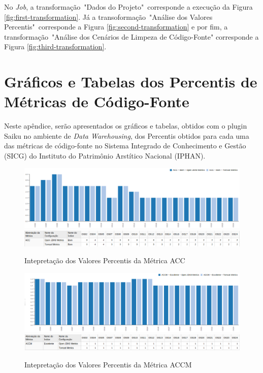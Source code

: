 \begin{apendicesenv}
No \textit{Job}, a transformação~"Dados do Projeto"~corresponde a execução da Figura \ref{fig:first-transformation}. Já a transoformação~"Análise dos Valores Percentis"~corresponde a Figura \ref{fig:second-transformation} e por fim, a transformação~"Análise dos Cenários de Limpeza de Código-Fonte" corresponde a Figura \ref{fig:third-transformation}.

\chapter{Gráficos e Tabelas dos Percentis de Métricas de Código-Fonte}

Neste apêndice, serão apresentados os gráficos e tabelas, obtidos com o plugin Saiku no ambiente de \textit{Data Warehousing}, dos Percentis obtidos para cada uma das métricas de código-fonte no Sistema Integrado de Conhecimento e Gestão (SICG) do Instituto do Patrimônio Arstítico Nacional (IPHAN).

\label{graphs}

\begin{figure}
\centering
\includegraphics[scale=0.70]{figuras/acc-grafico.eps}
\includegraphics[scale=0.70]{figuras/acc-tabela.eps}
\caption{Intepretação dos Valores Percentis da Métrica ACC}
\label{fig:metric-acc}
\FloatBarrier
\end{figure}

\begin{figure}
\centering
\includegraphics[scale=0.70]{figuras/accm-grafico.eps}
\includegraphics[scale=0.70]{figuras/accm-tabela.eps}
\caption{Intepretação dos Valores Percentis da Métrica ACCM}
\label{fig:metric-accm}
\FloatBarrier
\end{figure}


\end{apendicesenv}

